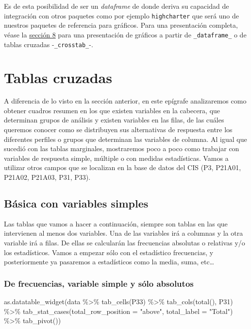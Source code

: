 \documentclass[
]{book}
\newenvironment{Shaded}{\begin{snugshade}}{\end{snugshade}}
\newcommand{\AttributeTok}[1]{\textcolor[rgb]{0.77,0.63,0.00}{#1}}
\newcommand{\FunctionTok}[1]{\textcolor[rgb]{0.00,0.00,0.00}{#1}}
\newcommand{\NormalTok}[1]{#1}
\newcommand{\SpecialCharTok}[1]{\textcolor[rgb]{0.00,0.00,0.00}{#1}}
\newcommand{\StringTok}[1]{\textcolor[rgb]{0.31,0.60,0.02}{#1}}
\begin{document}
Es de esta posibilidad de ser un \emph{dataframe} de donde deriva su capacidad de integración con otros paquetes como por ejemplo \texttt{highcharter} \citet{highcharter} que será uno de nuestros paquetes de referencia para gráficos. Para una presentación completa, véase la \protect\hyperlink{tse08}{sección 8} para una presentación de gráficos a partir de \texttt{\_dataframe\_} o de tablas cruzadas -\texttt{\_crosstab\_}-.

\hypertarget{tse04}{%
\chapter{Tablas cruzadas}\label{tse04}}

A diferencia de lo visto en la sección anterior, en este epígrafe analizaremos como obtener cuadros resumen en los que existen variables en la cabecera, que determinan grupos de análisis y existen variables en las filas, de las cuáles queremos conocer como se distribuyen sus alternativas de respuesta entre los diferentes perfiles o grupos que determinan las variables de columna. Al igual que sucedió con las tablas marginales, mostraremos poco a poco como trabajar con variables de respuesta simple, múltiple o con medidas estadísticas. Vamos a utilizar otros campos que se localizan en la base de datos del CIS (P3, P21A01, P21A02, P21A03, P31, P33).

\hypertarget{buxe1sica-con-variables-simples}{%
\section{Básica con variables simples}\label{buxe1sica-con-variables-simples}}

Las tablas que vamos a hacer a continuación, siempre son tablas en las que intervienen al menos dos variables. Una de las variables irá a columnas y la otra variable irá a filas. De ellas se calcularán las frecuencias absolutas o relativas y/o los estadísticos. Vamos a empezar sólo con el estadístico frecuencias, y posteriormente ya pasaremos a estadísticos como la media, suma, etc\ldots{}

\hypertarget{de-frecuencias-variable-simple-y-suxf3lo-absolutos}{%
\subsection{De frecuencias, variable simple y sólo absolutos}\label{de-frecuencias-variable-simple-y-suxf3lo-absolutos}}

\begin{Shaded}
\begin{Highlighting}[]
\FunctionTok{as.datatable\_widget}\NormalTok{(data }\SpecialCharTok{\%\textgreater{}\%} \FunctionTok{tab\_cells}\NormalTok{(P33) }\SpecialCharTok{\%\textgreater{}\%} \FunctionTok{tab\_cols}\NormalTok{(}\FunctionTok{total}\NormalTok{(), }
\NormalTok{  P31) }\SpecialCharTok{\%\textgreater{}\%} \FunctionTok{tab\_stat\_cases}\NormalTok{(}\AttributeTok{total\_row\_position =} \StringTok{"above"}\NormalTok{, }
  \AttributeTok{total\_label =} \StringTok{"Total"}\NormalTok{) }\SpecialCharTok{\%\textgreater{}\%} \FunctionTok{tab\_pivot}\NormalTok{())}
\end{Highlighting}
\end{Shaded}
\end{document}
